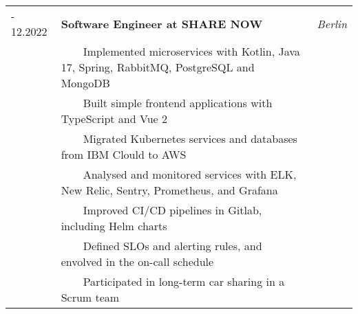 \documentclass{article}
\newcommand{\tabitem}{~~\llap{\textbullet}~~}
\begin{document}
\begin{tabularx}{\textwidth}{
        >{\hsize=0.5\hsize}X
        >{\hsize=2\hsize}X
        >{\raggedleft\arraybackslash\hsize=0.5\hsize}X
    }
    03.2020 - 12.2022 & \textbf{Software Engineer at SHARE NOW}                                                           & \textit{Berlin} \\[4pt]
                      & \tabitem Implemented microservices with Kotlin, Java 17, Spring, RabbitMQ, PostgreSQL and MongoDB                   \\
                      & \tabitem Built simple frontend applications with TypeScript and Vue 2                                               \\
                      & \tabitem Migrated Kubernetes services and databases from IBM Clould to AWS                                          \\
                      & \tabitem Analysed and monitored services with ELK, New Relic, Sentry, Prometheus, and Grafana                       \\
                      & \tabitem Improved CI/CD pipelines in Gitlab, including Helm charts                                                  \\
                      & \tabitem Defined SLOs and alerting rules, and envolved in the on-call schedule                                      \\
                      & \tabitem Participated in long-term car sharing in a Scrum team                                                      \\[8pt]


\end{tabularx}
\end{document}
